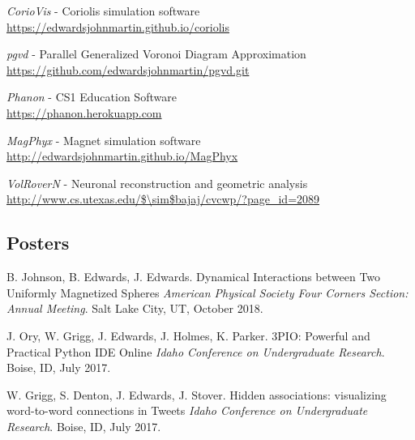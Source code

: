 \documentclass[margin,line]{res}
\begin{document}
\begin{resume}
\emph{CorioVis} - Coriolis simulation software\\
\url{https://edwardsjohnmartin.github.io/coriolis}

\emph{pgvd} - Parallel Generalized Voronoi Diagram Approximation\\
\url{https://github.com/edwardsjohnmartin/pgvd.git}

\emph{Phanon} - CS1 Education Software\\
\url{https://phanon.herokuapp.com}


\emph{MagPhyx} - Magnet simulation software\\
\url{http://edwardsjohnmartin.github.io/MagPhyx}


\emph{VolRoverN} - Neuronal reconstruction and geometric analysis\\
\url{http://www.cs.utexas.edu/$\sim$bajaj/cvcwp/?page\_id=2089}


\begin{LONG}

\section{\sc Posters}
B. Johnson, B. Edwards, J. Edwards.
Dynamical Interactions between Two Uniformly Magnetized Spheres
\textit{American Physical Society Four Corners Section: Annual Meeting}. Salt Lake City, UT, October 2018.

J. Ory, W. Grigg, J. Edwards, J. Holmes, K. Parker.
3PIO: Powerful and Practical Python IDE Online
\textit{Idaho Conference on Undergraduate Research}. Boise, ID, July 2017.

W. Grigg, S. Denton, J. Edwards, J. Stover.
Hidden associations: visualizing word-to-word connections in Tweets
\textit{Idaho Conference on Undergraduate Research}. Boise, ID, July 2017.


\end{LONG}
\end{resume}
\end{document}
